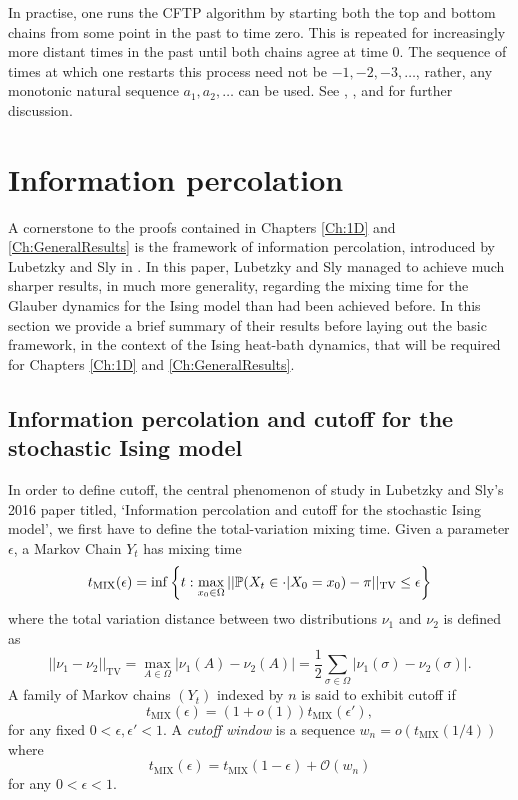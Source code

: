 	In practise, one runs the CFTP algorithm by starting both the top and bottom chains from some point in the past to time zero. This is repeated for increasingly more distant times in the past until both chains agree at time 0. The sequence of times at which one restarts this process need not be $-1, -2, -3, \dots$, rather, any monotonic natural sequence $a_1, a_2,\dots$ can  be used. See \cite{Levin2009-fo}, \cite{Haggstrom2002-os}, and \cite{Jerrum1998-ph} for further discussion.

	
\section{Information percolation}
	A cornerstone to the proofs contained in Chapters \ref{Ch:1D} and \ref{Ch:GeneralResults} is the framework of information percolation, introduced by Lubetzky and Sly in \cite{Lubetzky2016-wd}. In this paper, Lubetzky and Sly managed to achieve much sharper results, in much more generality, regarding the mixing time for the Glauber dynamics for the Ising model than had been achieved before. In this section we provide a brief summary of their results before laying out the basic framework, in the context of the Ising heat-bath dynamics, that will be required for Chapters \ref{Ch:1D} and \ref{Ch:GeneralResults}.

	\subsection{Information percolation and cutoff for the stochastic Ising model}
	In order to define cutoff, the central phenomenon of study in Lubetzky and Sly's 2016 paper titled, `Information percolation and cutoff for the stochastic Ising model', we first have to define the total-variation mixing time. Given a parameter $\epsilon$, a Markov Chain $Y_t$ has mixing time
	\begin{equation}
		t_\mathrm{MIX}(\epsilon) = \inf\left\{t: \max_{x_0 \in \Omega} ||\mathbb{P}(X_t \in \cdot | X_0 = x_0) - \pi ||_\mathrm{TV} \leq \epsilon \right\}
	\end{equation}
	where the total variation distance between two distributions $\nu_1$ and $\nu_2$ is defined as 
	\begin{equation}
		||\nu_1 - \nu_2||_\mathrm{TV} = \max_{A \in \Omega}|\nu_1(A) - \nu_2(A)| = \frac{1}{2}\sum_{\sigma \in \Omega} |\nu_1(\sigma) - \nu_2(\sigma)|.
	\end{equation}
	A family of Markov chains $(Y_t)$ indexed by $n$ is said to exhibit cutoff if
	\begin{equation}
		t_\mathrm{MIX}(\epsilon) = (1 + o(1)) t_\mathrm{MIX}(\epsilon'),
	\end{equation}
	for any fixed $0 < \epsilon, \epsilon' < 1$. A \emph{cutoff window} is a sequence $w_n = o(t_\mathrm{MIX}(1/4))$ where
	\begin{equation}
		t_\mathrm{MIX}(\epsilon) = t_\mathrm{MIX}(1 - \epsilon) + \mathcal{O}(w_n)
	\end{equation}
	for any $0 < \epsilon <1$.

